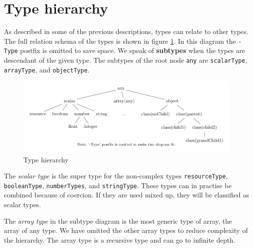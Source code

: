 \documentclass[../main.tex]{subfiles}
\begin{document}
    \section{Type hierarchy}\label{sec:type_hierarchy}
    
    As described in some of the previous descriptions, types can relate to other types.
    The full relation schema of the types is shown in figure \ref{fig:type_hierarchy}.
    In this diagram the \texttt{-Type} postfix is omitted to save space.
    We speak of \textbf{subtypes} when the types are descendant of the given type.
    The subtypes of the root node \texttt{any} are \texttt{scalarType}, \texttt{arrayType}, and \texttt{objectType}.
    
    \begin{figure}[H]
        \includegraphics{Diagrams/Subtypes.pdf}
        \caption{Type hierarchy}
        \label{fig:type_hierarchy}
    \end{figure}
    

    The \textit{scalar type} is the super type for the non-complex types \texttt{resourceType}, \texttt{booleanType}, \texttt{numberTypes}, and \texttt{stringType}.
    These types can in practise be combined because of coercion.
    If they are used mixed up, they will be classified as scalar types.
    
	The \textit{array type} in the subtype diagram is the most generic type of array, the array of any type.
	We have omitted the other array types to reduce complexity of the hierarchy.
	The array type is a recursive type and can go to infinite depth.
 
\end{document}
